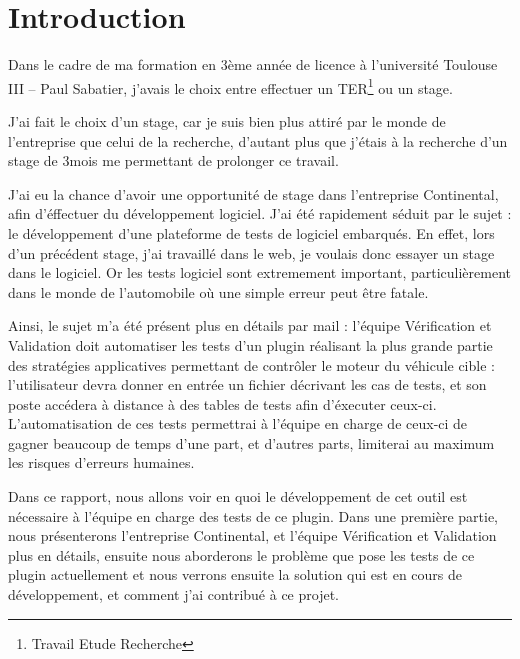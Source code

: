 \chapter*{Introduction}
	Dans le cadre de ma formation en 3ème année de licence à l'université Toulouse III -- Paul Sabatier, j'avais le choix entre effectuer un TER\footnote{Travail Etude Recherche} ou un stage.

	J'ai fait le choix d'un stage, car je suis bien plus attiré par le monde de l'entreprise que celui de la recherche, d'autant plus que j'étais à la recherche d'un stage de 3mois me permettant de prolonger ce travail.

	J'ai eu la chance d'avoir une opportunité de stage dans l'entreprise Continental, afin d'éffectuer du développement logiciel. J'ai été rapidement séduit par le sujet : le développement d'une plateforme de tests de logiciel embarqués. En effet, lors d'un précédent stage, j'ai travaillé dans le web, je voulais donc essayer un stage dans le logiciel. Or les tests logiciel sont extremement important, particulièrement dans le monde de l'automobile où une simple erreur peut être fatale.

	Ainsi, le sujet m'a été présent plus en détails par mail : l'équipe Vérification et Validation doit automatiser les tests d'un plugin réalisant la plus grande partie des stratégies applicatives permettant de contrôler le moteur du véhicule cible : l'utilisateur devra donner en entrée un fichier décrivant les cas de tests, et son poste accédera à distance à des tables de tests afin d'éxecuter ceux-ci.\\
	L'automatisation de ces tests permettrai à l'équipe en charge de ceux-ci de gagner beaucoup de temps d'une part, et d'autres parts, limiterai au maximum les risques d'erreurs humaines.

	Dans ce rapport, nous allons voir en quoi le développement de cet outil est nécessaire à l'équipe en charge des tests de ce plugin. Dans une première partie, nous présenterons l'entreprise Continental, et l'équipe Vérification et Validation plus en détails, ensuite nous aborderons le problème que pose les tests de ce plugin actuellement et nous verrons ensuite la solution qui est en cours de développement, et comment j'ai contribué à ce projet.


